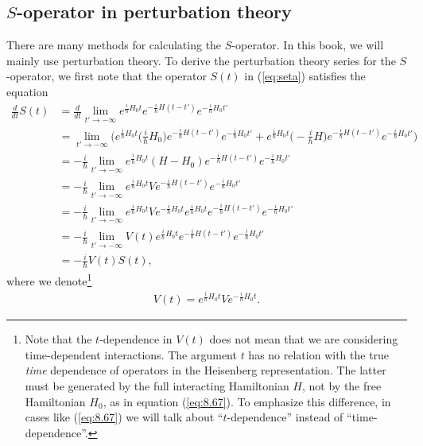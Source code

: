 \documentclass[]{stefan1}
\begin{document}
\subsection{$S$-operator in perturbation theory}\label{ss:perturbation}
There are many methods for calculating the $ S $-operator. In this book,
we will mainly use perturbation theory. To derive the perturbation
theory series for the $ S $-operator, we first note that the operator
$ S (t) $ in (\ref{eq:seta}) satisfies the equation
%
\begin{align}
\frac{d}{dt} S(t)
&= \frac{d}{dt} \lim_{t' \to - \infty } e^{\frac{i}{\hbar }H_{0}t} e
^{-\frac{i}{\hbar }H ( t-t' ) } e^{-\frac{i}{\hbar }H_{0}t'}
\nonumber
\\
&= \lim_{t' \to - \infty } \biggl(e^{\frac{i}{\hbar }H_{0}t} \biggl(
\frac{i}{
\hbar }H_{0} \biggr) e^{-\frac{i}{\hbar }H ( t-t' ) } e^{-\frac{i}{
\hbar }H_{0}t'} +
e^{\frac{i}{\hbar }H_{0}t} \biggl( -\frac{i}{\hbar }H \biggr) e^{-\frac{i}{\hbar }H ( t-t' ) }
e^{-\frac{i}{\hbar }H_{0}t'} \biggr)
\nonumber
\\
&= -\frac{i}{\hbar } \lim_{t' \to - \infty } e^{\frac{i}{\hbar }H
_{0}t} (H-
H_{0}) e^{-\frac{i}{\hbar }H ( t-t' ) } e^{-\frac{i}{
\hbar }H_{0}t'}
\nonumber
\\
&= -\frac{i}{\hbar } \lim_{t' \to - \infty } e^{\frac{i}{\hbar }H
_{0}t} V
e^{-\frac{i}{\hbar }H ( t-t' ) } e^{-\frac{i}{\hbar }H
_{0}t'}
\nonumber
\\
&= -\frac{i}{\hbar } \lim_{t' \to - \infty } e^{\frac{i}{\hbar }H
_{0}t} V
e^{-\frac{i}{\hbar }H_{0}t} e^{\frac{i}{\hbar }H_{0}t}e^{-\frac{i}{
\hbar }H ( t-t' ) } e^{-\frac{i}{\hbar }H_{0}t'}
\nonumber
\\
&= -\frac{i}{\hbar } \lim_{t' \to - \infty } V(t) e^{\frac{i}{\hbar
}H_{0}t}e^{-\frac{i}{\hbar }H ( t-t' ) }
e^{-\frac{i}{\hbar }H
_{0}t'}
\nonumber
\\
&= -\frac{i}{\hbar } V(t) S(t), \label{eq:8.66}
\end{align}
where we denote\footnote{Note that the $ t $-dependence
 in $ V (t) $ does not mean that we are considering
time-dependent interactions. The argument $ t $ has no relation with the
true \emph{time} dependence of operators in the Heisenberg representation.
The latter must be generated by the full interacting Hamiltonian $ H $,
not by the free Hamiltonian $ H_{0} $, as in equation (\ref{eq:8.67}).
To emphasize this difference, in cases like (\ref{eq:8.67}) we will talk
about ``$ t $-dependence'' instead of ``time-dependence''.}
%
\begin{align}
V(t) = e^{\frac{i}{\hbar }H_{0}t} V e^{-\frac{i}{\hbar }H_{0}t}. \label{eq:8.67}
\end{align}
\end{document}

